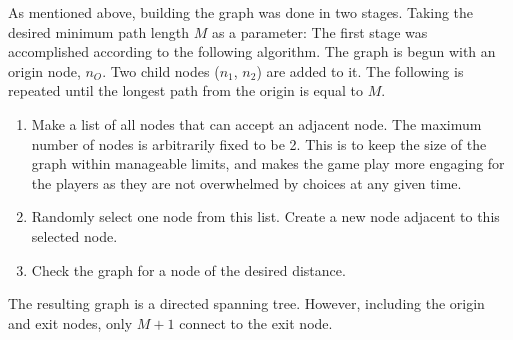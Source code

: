 \documentclass[landscape, a0, final]{a0poster}
\begin{document}
\begin{minipage}[c]{0.50\linewidth}
\begin{minipage}[c]{0.50\linewidth}
\begin{minipage}{0.9\linewidth}
As mentioned above, building the graph was done in two stages.  Taking the desired minimum path length $M$ as a parameter: 
The first stage was accomplished according to the following algorithm.  The graph is begun with an origin node, $n_O$.  Two child nodes ($n_1$, $n_2$) are added to it.  The following is repeated until the longest path from the origin is equal to $M$. 
\begin{enumerate} 
    \item Make a list of all nodes that can accept an adjacent node.  The maximum number of nodes is arbitrarily fixed to be 2.  This is to keep the size of the graph within manageable limits, and makes the game play more engaging for the players as they are not overwhelmed by choices at any given time. 
    \item Randomly select one node from this list.  Create a new node adjacent to this selected node.
    \item Check the graph for a node of the desired distance.
\end{enumerate} 
The resulting graph is a directed spanning tree.  However, including the origin and exit nodes, only $M + 1$ connect to the exit node.


\end{minipage}
\end{minipage}
\end{minipage}
\end{document}
